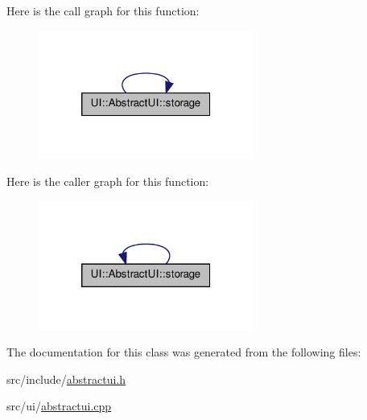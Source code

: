Here is the call graph for this function:
\nopagebreak
\begin{figure}[H]
\begin{center}
\leavevmode
\includegraphics[width=200pt]{de/dda/classUI_1_1AbstractUI_ac724d598f9b90d72ec9dc4777f92d43b_cgraph}
\end{center}
\end{figure}




Here is the caller graph for this function:
\nopagebreak
\begin{figure}[H]
\begin{center}
\leavevmode
\includegraphics[width=200pt]{de/dda/classUI_1_1AbstractUI_ac724d598f9b90d72ec9dc4777f92d43b_icgraph}
\end{center}
\end{figure}




The documentation for this class was generated from the following files:\begin{DoxyCompactItemize}
\item 
src/include/\hyperlink{abstractui_8h}{abstractui.h}\item 
src/ui/\hyperlink{abstractui_8cpp}{abstractui.cpp}\end{DoxyCompactItemize}
